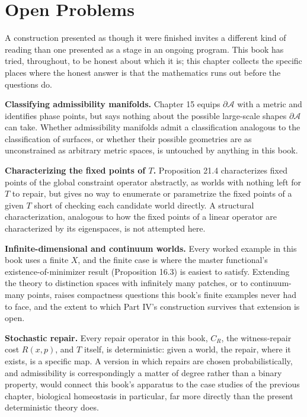 \documentclass[11pt]{book}
\begin{document}
\chapter*{Open Problems}

A construction presented as though it were finished invites a different kind of reading than one presented as a stage in an ongoing program. This book has tried, throughout, to be honest about which it is; this chapter collects the specific places where the honest answer is that the mathematics runs out before the questions do.

\textbf{Classifying admissibility manifolds.} Chapter 15 equips $\partial \mathcal A$ with a metric and identifies phase points, but says nothing about the possible large-scale shapes $\partial \mathcal A$ can take. Whether admissibility manifolds admit a classification analogous to the classification of surfaces, or whether their possible geometries are as unconstrained as arbitrary metric spaces, is untouched by anything in this book.

\textbf{Characterizing the fixed points of $T$.} Proposition 21.4 characterizes fixed points of the global constraint operator abstractly, as worlds with nothing left for $T$ to repair, but gives no way to enumerate or parametrize the fixed points of a given $T$ short of checking each candidate world directly. A structural characterization, analogous to how the fixed points of a linear operator are characterized by its eigenspaces, is not attempted here.

\textbf{Infinite-dimensional and continuum worlds.} Every worked example in this book uses a finite $X$, and the finite case is where the master functional's existence-of-minimizer result (Proposition 16.3) is easiest to satisfy. Extending the theory to distinction spaces with infinitely many patches, or to continuum-many points, raises compactness questions this book's finite examples never had to face, and the extent to which Part IV's construction survives that extension is open.

\textbf{Stochastic repair.} Every repair operator in this book, $C_R$, the witness-repair cost $R(x,p)$, and $T$ itself, is deterministic: given a world, the repair, where it exists, is a specific map. A version in which repairs are chosen probabilistically, and admissibility is correspondingly a matter of degree rather than a binary property, would connect this book's apparatus to the case studies of the previous chapter, biological homeostasis in particular, far more directly than the present deterministic theory does.
\end{document}
